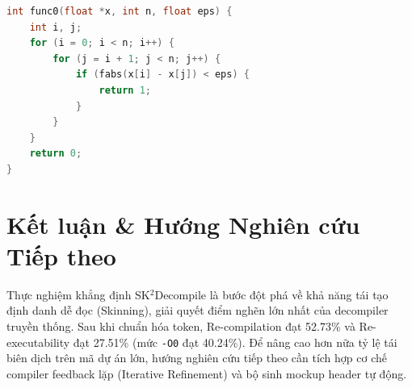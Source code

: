 \documentclass[11pt,a4paper]{article}
\begin{document}
\begin{lstlisting}[language=C, caption={Mã đã được khử dính token ở Lần chạy mới nhất (Vượt qua 100\% unit tests).}]
int func0(float *x, int n, float eps) {
    int i, j;
    for (i = 0; i < n; i++) {
        for (j = i + 1; j < n; j++) {
            if (fabs(x[i] - x[j]) < eps) {
                return 1;
            }
        }
    }
    return 0;
}
\end{lstlisting}

\section{Kết luận \& Hướng Nghiên cứu Tiếp theo}
Thực nghiệm khẳng định SK$^2$Decompile là bước đột phá về khả năng tái tạo định danh dễ đọc (Skinning), giải quyết điểm nghẽn lớn nhất của decompiler truyền thống. Sau khi chuẩn hóa token, Re-compilation đạt 52.73\% và Re-executability đạt 27.51\% (mức \texttt{-O0} đạt 40.24\%). Để nâng cao hơn nữa tỷ lệ tái biên dịch trên mã dự án lớn, hướng nghiên cứu tiếp theo cần tích hợp cơ chế compiler feedback lặp (Iterative Refinement) và bộ sinh mockup header tự động.
\end{document}
